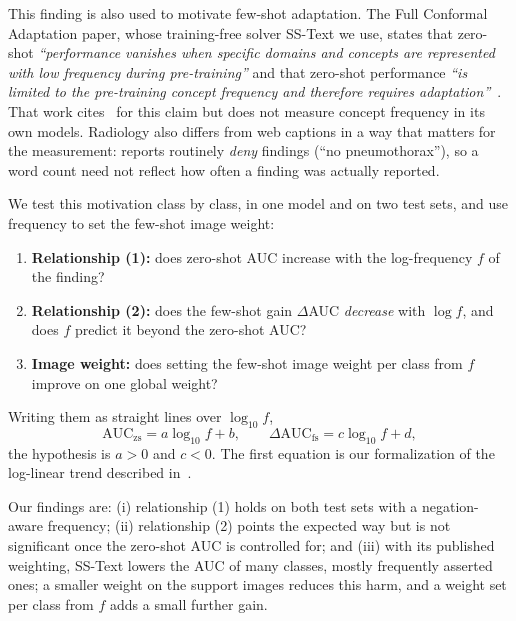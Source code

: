 \documentclass[journal]{IEEEtran}
\begin{document}
This finding is also used to motivate few-shot adaptation. The Full Conformal Adaptation paper, whose
training-free solver SS-Text we use, states that zero-shot \emph{``performance vanishes when specific
domains and concepts are represented with low frequency during pre-training''} and that zero-shot
performance \emph{``is limited to the pre-training concept frequency and therefore requires
adaptation''}~\cite{silvarodriguez2025fca}. That work cites~\cite{udandarao2024zeroshot} for this
claim but does not measure concept frequency in its own models. Radiology also differs from web captions in a way that matters for the
measurement: reports routinely \emph{deny} findings (``no pneumothorax''), so a word count need not
reflect how often a finding was actually reported.

We test this motivation class by class, in one model and on two test sets, and use frequency to set the
few-shot image weight:
\begin{enumerate}
\item \textbf{Relationship (1):} does zero-shot AUC increase with the log-frequency $f$ of the finding?
\item \textbf{Relationship (2):} does the few-shot gain $\Delta$AUC \emph{decrease} with $\log f$, and
does $f$ predict it beyond the zero-shot AUC?
\item \textbf{Image weight:} does setting the few-shot image weight per class from $f$ improve on one
global weight?
\end{enumerate}
Writing them as straight lines over $\log_{10} f$,
\begin{equation}
\mathrm{AUC}_{\mathrm{zs}} = a\log_{10} f + b, \qquad \Delta\mathrm{AUC}_{\mathrm{fs}} = c\log_{10} f + d,
\end{equation}
the hypothesis is $a>0$ and $c<0$. The first equation is our formalization of the log-linear trend
described in~\cite{udandarao2024zeroshot}.

Our findings are: (i) relationship (1) holds on both test sets with a negation-aware frequency;
(ii) relationship (2) points the expected way but is not significant once the zero-shot AUC is
controlled for; and (iii) with its published weighting, SS-Text lowers the AUC of many classes, mostly
frequently asserted ones; a smaller weight on the support images reduces this harm, and a weight set per
class from $f$ adds a small further gain.



\end{document}
